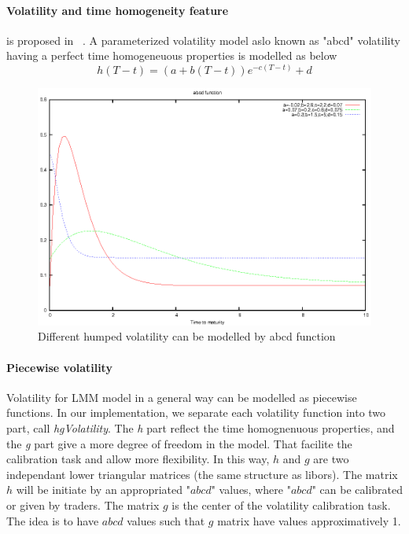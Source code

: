\documentclass[a4paper,10pt]{article}
\begin{document}
\paragraph{Volatility and time homogeneity feature} is proposed in ~\cite{REBONATO2002}. A parameterized volatility model aslo known as "abcd" volatility having a perfect time homogeneuous properties is modelled as below
\[
h(T-t) = (a + b(T-t)) e^{-c(T-t)} + d
\]
\begin {figure}[h]
\begin{center}
\includegraphics[scale=1.0]{gnuplot_abcdFunction}
\end{center}
\caption{\label{abcd_curve} Different humped volatility can be modelled by  abcd function}
\end {figure}
\paragraph{Piecewise volatility}
Volatility for LMM model in a general way can be modelled as piecewise functions. In our implementation, we separate each volatility function into two part, call \textit{hgVolatility}. The \textit{h} part reflect the time homognenuous properties, and the \textit{g} part give a more degree of freedom in the model. That facilite the calibration task and allow more flexibility. In this way, $h$ and $g$ are two independant lower triangular matrices (the same structure as libors). The matrix $h$ will be initiate by an appropriated "$abcd$" values, where "$abcd$" can be calibrated or given by traders. The matrix $g$ is the center of the volatility calibration task. The idea is to have $abcd$ values such that $g$ matrix have values approximatively 1.
\end{document}
